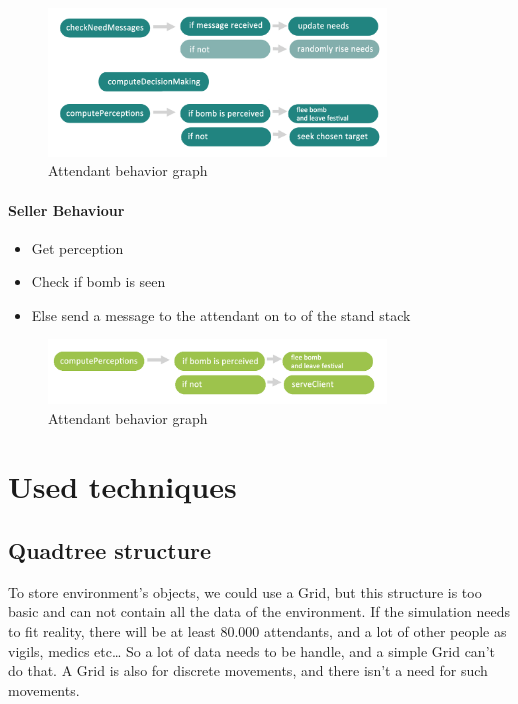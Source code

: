 \begin{figure}[h]
	\begin{center}
		\includegraphics[width=0.8\textwidth]{img/attendantbehaviour.png}
	\end{center}
	\caption{Attendant behavior graph}
\end{figure}

\paragraph{Seller Behaviour}

\begin{itemize}
	\item Get perception
	\item Check if bomb is seen
	\item Else send a message to the attendant on to of the stand stack
\end{itemize}

\begin{figure}[h]
	\begin{center}
		\includegraphics[width=0.8\textwidth]{img/sellerbehaviour.png}
	\end{center}
	\caption{Attendant behavior graph}
\end{figure}

\newpage

\section{Used techniques}

\subsection{Quadtree structure}

To store environment’s objects, we could use a Grid, but this structure is too
basic and can not contain all the data of the environment. If the simulation
needs to fit reality, there will be at least 80.000 attendants, and a lot of
other people as vigils, medics etc… So a lot of data needs to be handle, and a
simple Grid can’t do that. A Grid is also for discrete movements, and there
isn’t a need for such movements.\\

